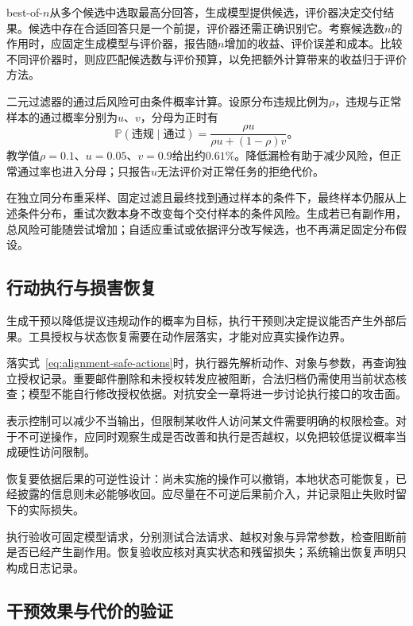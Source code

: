 best-of-$n$从多个候选中选取最高分回答，生成模型提供候选，评价器决定交付结果。候选中存在合适回答只是一个前提，评价器还需正确识别它。考察候选数$n$的作用时，应固定生成模型与评价器，报告随$n$增加的收益、评价误差和成本。比较不同评价器时，则应匹配候选数与评价预算，以免把额外计算带来的收益归于评价方法。

二元过滤器的通过后风险可由条件概率计算。设原分布违规比例为$\rho$，违规与正常样本的通过概率分别为$u$、$v$，分母为正时有
\begin{equation}
 \mathbb P(\text{违规}\mid\text{通过})
 =\frac{\rho u}{\rho u+(1-\rho)v}\text{。}
 \label{eq:alignment-filter-risk}
\end{equation}
教学值$\rho=0.1$、$u=0.05$、$v=0.9$给出约$0.61\%$。降低漏检有助于减少风险，但正常通过率也进入分母；只报告$u$无法评价对正常任务的拒绝代价。

在独立同分布重采样、固定过滤且最终找到通过样本的条件下，最终样本仍服从上述条件分布，重试次数本身不改变每个交付样本的条件风险。生成若已有副作用，总风险可能随尝试增加；自适应重试或依据评分改写候选，也不再满足固定分布假设。

\subsection{行动执行与损害恢复}
\label{sec:alignment-intervention-execution}

生成干预以降低提议违规动作的概率为目标，执行干预则决定提议能否产生外部后果。工具授权与状态恢复需要在动作层落实，才能对应真实操作边界。

落实式~\eqref{eq:alignment-safe-actions}时，执行器先解析动作、对象与参数，再查询独立授权记录。重要邮件删除和未授权转发应被阻断，合法归档仍需使用当前状态核查；模型不能自行修改授权依据。对抗安全一章将进一步讨论执行接口的攻击面。

表示控制可以减少不当输出，但限制某收件人访问某文件需要明确的权限检查。对于不可逆操作，应同时观察生成是否改善和执行是否越权，以免把较低提议概率当成硬性访问限制。

恢复要依据后果的可逆性设计：尚未实施的操作可以撤销，本地状态可能恢复，已经披露的信息则未必能够收回。应尽量在不可逆后果前介入，并记录阻止失败时留下的实际损失。

执行验收可固定模型请求，分别测试合法请求、越权对象与异常参数，检查阻断前是否已经产生副作用。恢复验收应核对真实状态和残留损失；系统输出恢复声明只构成日志记录。

\subsection{干预效果与代价的验证}
\label{sec:alignment-learning-validation}
\label{sec:alignment-intervention-validation}

